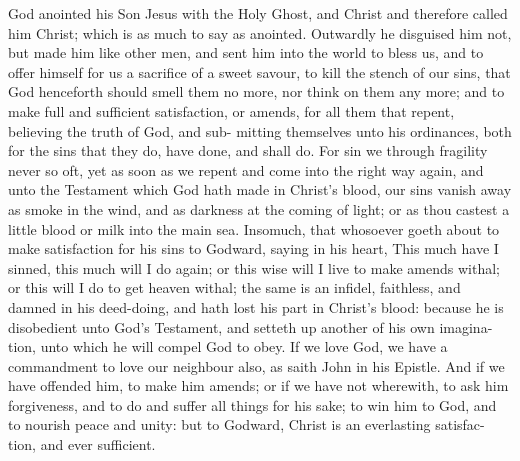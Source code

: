 \documentclass{custom}
\begin{document}
God anointed his Son Jesus with the Holy Ghost, and Christ and 
therefore called him Christ; which is as much to say as 
anointed. Outwardly he disguised him not, but made 
him like other men, and sent him into the world to bless 
us, and to offer himself for us a sacrifice of a sweet savour, 
to kill the stench of our sins, that God henceforth should 
smell them no more, nor think on them any more; and to 
make full and sufficient satisfaction, or amends, for all 
them that repent, believing the truth of God, and sub- 
mitting themselves unto his ordinances, both for the sins 
that they do, have done, and shall do. For sin we through 
fragility never so oft, yet as soon as we repent and come 
into the right way again, and unto the Testament which 
God hath made in Christ's blood, our sins vanish away 
as smoke in the wind, and as darkness at the coming of 
light; or as thou castest a little blood or milk into the main 
sea. Insomuch, that whosoever goeth about to make 
satisfaction for his sins to Godward, saying in his heart, 
This much have I sinned, this much will I do again; or 
this wise will I live to make amends withal; or this will I 
do to get heaven withal; the same is an infidel, faithless, 
and damned in his deed-doing, and hath lost his part in 
Christ's blood: because he is disobedient unto God's 
Testament, and setteth up another of his own imagina- 
tion, unto which he will compel God to obey. If we 
love God, we have a commandment to love our neighbour 
also, as saith John in his Epistle. And if we have offended 
him, to make him amends; or if we have not wherewith, 
to ask him forgiveness, and to do and suffer all things for 
his sake; to win him to God, and to nourish peace and 
unity: but to Godward, Christ is an everlasting satisfac- 
tion, and ever sufficient. 
\end{document}
